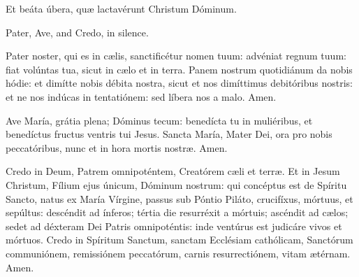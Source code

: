 \documentclass[12pt,a5paper,openany]{memoir}
\begin{document}
\response Et beáta úbera, quæ lactavérunt Christum Dóminum.

\switchcolumn



\switchcolumn*
{}

Pater, Ave, and Credo, in silence.

\switchcolumn


\switchcolumn*

Pater noster, qui es in cælis, sanctificétur nomen tuum: advéniat regnum tuum: fiat volúntas tua, sicut in cælo et in terra. Panem nostrum quotidiánum da nobis hódie: et dimítte nobis débita nostra, sicut et nos dimíttimus debitóribus nostris: et ne nos indúcas in tentatiónem: sed líbera nos a malo. Amen.

\switchcolumn


\switchcolumn*

Ave María, grátia plena; Dóminus tecum: benedícta tu in muliéribus, et benedíctus fructus ventris tui Jesus. Sancta María, Mater Dei, ora pro nobis peccatóribus, nunc et in hora mortis nostræ. Amen.


\switchcolumn


\switchcolumn*

Credo in Deum, Patrem omnipoténtem, Creatórem cæli et terræ. Et in Jesum Christum, Fílium ejus únicum, Dóminum nostrum: qui concéptus est de Spíritu Sancto, natus ex María Vírgine, passus sub Póntio Piláto, crucifíxus, mórtuus, et sepúltus: descéndit ad ínferos; tértia die resurréxit a mórtuis; ascéndit ad cælos; sedet ad déxteram Dei Patris omnipoténtis: inde ventúrus est judicáre vivos et mórtuos. Credo in Spíritum Sanctum, sanctam Ecclésiam cathólicam, Sanctórum communiónem, remissiónem peccatórum, carnis resurrectiónem, vitam ætérnam. Amen.
\switchcolumn
\end{document}
